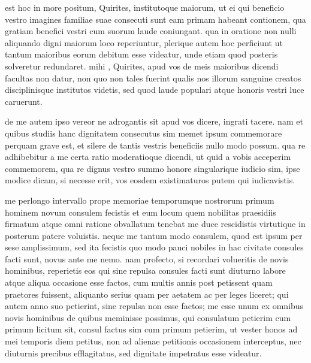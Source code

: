 
 est hoc in more positum, Quirites, institutoque maiorum, ut ei qui beneficio vestro imagines familiae suae consecuti sunt eam primam habeant contionem, qua gratiam benefici vestri cum suorum laude coniungant. qua in oratione non nulli aliquando digni maiorum loco reperiuntur, plerique autem hoc perficiunt ut tantum maioribus eorum debitum esse videatur, unde etiam quod posteris solveretur redundaret. mihi , Quirites, apud vos de meis maioribus dicendi facultas non datur, non quo non tales fuerint qualis nos illorum sanguine creatos disciplinisque institutos videtis, sed quod laude populari atque honoris vestri luce caruerunt.

 de me autem ipso vereor ne adrogantis sit apud vos dicere, ingrati tacere. nam et quibus studiis hanc dignitatem consecutus sim memet ipsum commemorare perquam grave est, et silere de tantis vestris beneficiis nullo modo possum. qua re adhibebitur a me certa ratio moderatioque dicendi, ut quid a vobis acceperim commemorem, qua re dignus vestro summo honore singularique iudicio sim, ipse modice dicam, si necesse erit, vos eosdem existimaturos putem qui iudicavistis.

 me perlongo intervallo prope memoriae temporumque nostrorum primum hominem novum consulem fecistis et eum locum quem nobilitas praesidiis firmatum atque omni ratione obvallatum tenebat me duce rescidistis virtutique in posterum patere voluistis. neque me tantum modo consulem, quod est ipsum per sese amplissimum, sed ita fecistis quo modo pauci nobiles in hac civitate consules facti sunt, novus ante me nemo. nam profecto, si recordari volueritis de novis hominibus, reperietis eos qui sine repulsa consules facti sunt diuturno labore atque aliqua occasione esse factos, cum multis annis post petissent quam praetores fuissent, aliquanto serius quam per aetatem ac per leges liceret; qui autem anno suo petierint, sine repulsa non esse factos; me esse unum ex omnibus novis hominibus de quibus meminisse possimus, qui consulatum petierim cum primum licitum sit, consul factus sim cum primum petierim, ut vester honos ad mei temporis diem petitus, non ad alienae petitionis occasionem interceptus, nec diuturnis precibus efflagitatus, sed dignitate impetratus esse videatur.

